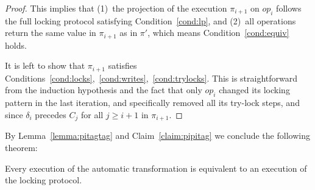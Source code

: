\begin{proof}
This implies that (1)~the projection of the execution $\pi_{i+1}$ on $op_{i}$
follows the full locking protocol satisfying Condition~\ref{cond:lp}, and
(2)~all operations return the same value in $\pi_{i+1}$ as in $\pi'$, which
means Condition~\ref{cond:equiv} holds.

It is left to show that $\pi_{i+1}$ satisfies
Conditions~\ref{cond:locks},~\ref{cond:writes},~\ref{cond:trylocks}.
This is straightforward from the induction hypothesis and the fact that only
$op_{i}$ changed its locking pattern in the last iteration, and specifically
removed all its try-lock steps, and since $\delta_i$ precedes $C_{j}$ for all
$j\geq i+1$ in $\pi_{i+1}$.
 
\end{proof}

By Lemma~\ref{lemma:pitagtag} and Claim~\ref{claim:pipitag} we conclude the following
theorem:
\begin{theorem}
Every execution of the automatic transformation is equivalent to an
execution of the locking protocol.
\end{theorem}
